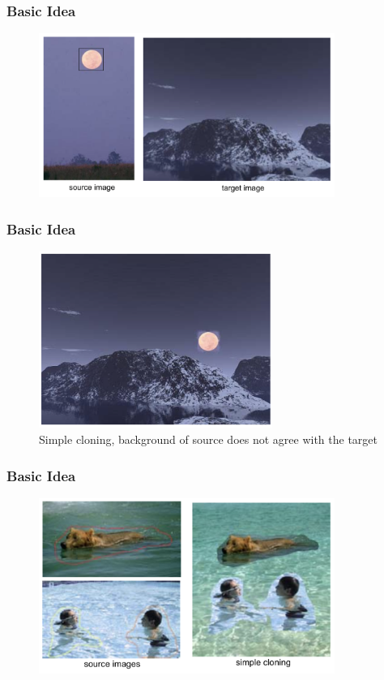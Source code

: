 \documentclass{beamer}
\begin{document}
\begin{frame}
\frametitle{Basic Idea}
\begin{figure}[!ht]
    \centering
    \includegraphics[width=3.8in]{resource/source_target_1.png}            
\end{figure}
\end{frame}

\begin{frame}
\frametitle{Basic Idea}
\begin{figure}[!ht]
    \centering
    \includegraphics[width=3.0in]{resource/simple_cloning_1.png}        
    \caption{Simple cloning, background of source does not agree with the target}
\end{figure}
\end{frame}

\begin{frame}
\frametitle{Basic Idea}
\begin{figure}[!ht]
    \centering
    \includegraphics[width=3.8in]{resource/simple_cloning_2.png}        
\end{figure}
\end{frame}
\end{document}
